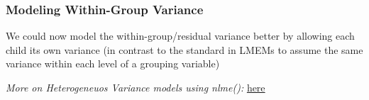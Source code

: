 \documentclass{beamer}
\newenvironment{VerbatimIN}
 {\VerbatimEnvironment
  \begin{tcolorbox}[
    breakable,
    colback=lightgray,
    spartan
  ]%
  \begin{Verbatim}}
 {\end{Verbatim}\end{tcolorbox}}
\begin{document}

\begin{frame}
    \frametitle{Modeling Within-Group Variance}
    \large
    We could now model the within-group/residual variance better by allowing each child its own variance (in contrast to the standard in LMEMs to assume the same variance within each level of a grouping variable)
    \vspace{0.5cm}
    
    \textit{More on Heterogeneuos Variance models using nlme():} \color{blue}\href{https://quantdev.ssri.psu.edu/sites/qdev/files/ILD_Ch06_2017_MLMwithHeterogeneousVariance.html}{here}
\end{frame}
\end{document}
